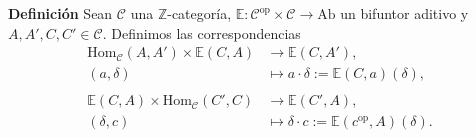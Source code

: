 \documentclass[preview]{standalone}
\begin{document}
\begin{center}
\flushleft \textbf{Definición} Sean $\mathscr{C}$ una $\mathbb{Z}$-categoría, $\mathbb{E}:\mathscr{C}^\text{op}\times\mathscr{C}\to\text{Ab}$ un bifuntor aditivo y $A,A',C,C'\in\mathscr{C}$. Definimos las correspondencias \begin{align*} \text{Hom}_\mathscr{C}(A,A')\times\mathbb{E}(C,A) &\to \mathbb{E}(C,A'), \\ (a,\delta) &\mapsto a\cdot\delta:=\mathbb{E}(C,a)(\delta), \\ \\ \mathbb{E}(C,A)\times\text{Hom}_\mathscr{C}(C',C) &\to \mathbb{E}(C',A), \\ (\delta,c) &\mapsto \delta\cdot c:=\mathbb{E}(c^\text{op},A)(\delta). \end{align*}
\end{center}
\end{document}
